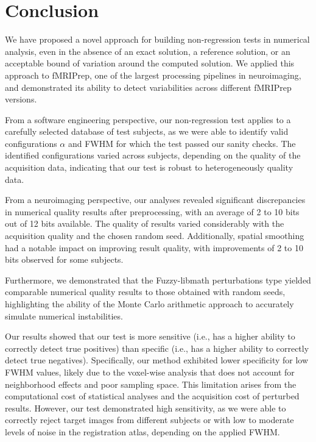 \documentclass{article}
\newcommand{\fmriprep}{fMRIPrep\xspace}
\begin{document}
\section{Conclusion}

We have proposed a novel approach for building non-regression tests in numerical analysis, even in the absence of an exact solution, a reference solution, or an acceptable bound of variation around the computed solution. We applied this approach to \fmriprep, one of the largest processing pipelines in neuroimaging, and demonstrated its ability to detect variabilities across different \fmriprep versions.

From a software engineering perspective, our non-regression test applies to a carefully selected database of test subjects, as we were able to identify valid configurations $\alpha$ and FWHM for which the test passed our sanity checks. The identified configurations varied across subjects, depending on the quality of the acquisition data, indicating that our test is robust to heterogeneously quality data.

From a neuroimaging perspective, our analyses revealed significant discrepancies in numerical quality results after preprocessing, with an average of 2 to 10 bits out of 12 bits available. The quality of results varied considerably with the acquisition quality and the chosen random seed. Additionally, spatial smoothing had a notable impact on improving result quality, with improvements of 2 to 10 bits observed for some subjects.

Furthermore, we demonstrated that the Fuzzy-libmath perturbations type yielded comparable numerical quality results to those obtained with random seeds, highlighting the ability of the Monte Carlo arithmetic approach to accurately simulate numerical instabilities.

Our results showed that our test is more sensitive (i.e., has a higher ability to correctly detect true positives) than specific (i.e., has a higher ability to correctly detect true negatives). Specifically, our method exhibited lower specificity for low FWHM values, likely due to the voxel-wise analysis that does not account for neighborhood effects and poor sampling space. This limitation arises from the computational cost of statistical analyses and the acquisition cost of perturbed results. However, our test demonstrated high sensitivity, as we were able to correctly reject target images from different subjects or with low to moderate levels of noise in the registration atlas, depending on the applied FWHM.
\end{document}
